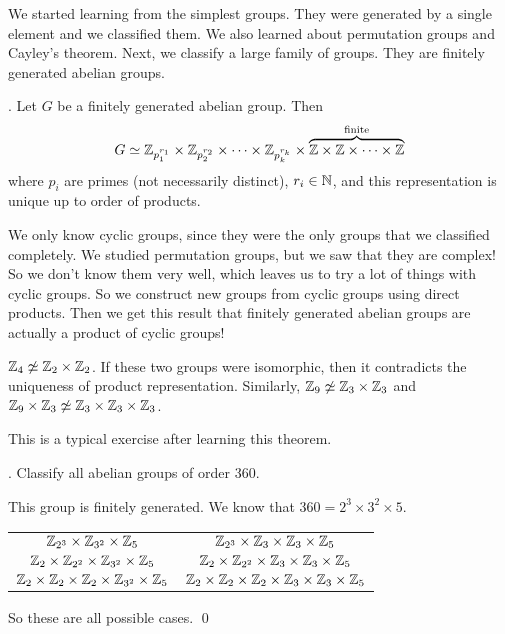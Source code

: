 We started learning from the simplest groups. They were generated by a single element and we classified them. We also learned about permutation groups and Cayley's theorem. Next, we classify a large family of groups. They are finitely generated abelian groups.

\thm.  Let \(G\) be a finitely generated abelian group. Then
\[
    G \simeq\mathbb{Z}_{p_1^{r_1}} \times \mathbb{Z}_{p_2^{r_2}} \times \cdots \times \mathbb{Z}_{p_k^{r_k}} \times \overbrace{\mathbb{Z} \times \mathbb{Z} \times \cdots \times \mathbb{Z}}^{\text{finite}}
\]
where \(p_i\) are primes (not necessarily distinct), \(r_i \in \mathbb{N}\), and this representation is unique up to order of products.

We only know cyclic groups, since they were the only groups that we classified completely. We studied permutation groups, but we saw that they are complex! So we don't know them very well, which leaves us to try a lot of things with cyclic groups. So we construct new groups from cyclic groups using direct products. Then we get this result that finitely generated abelian groups are actually a product of cyclic groups!

\rmk \(\mathbb{Z}_4 \not\simeq \mathbb{Z}_2 \times \mathbb{Z}_2\). If these two groups were isomorphic, then it contradicts the uniqueness of product representation. Similarly, \(\mathbb{Z}_9 \not\simeq \mathbb{Z}_3 \times \mathbb{Z}_3\) and \(\mathbb{Z}_9 \times \mathbb{Z}_3 \not\simeq \mathbb{Z}_3 \times \mathbb{Z}_3 \times \mathbb{Z}_3\).

This is a typical exercise after learning this theorem.

\ex. Classify all abelian groups of order 360.

\pf This group is finitely generated. We know that \(360 = 2^3 \times 3^2 \times 5\).
\begin{center}
    \begin{tabular}{cc}
        \(\mathbb{Z}_{2^3} \times \mathbb{Z}_{3^2} \times \mathbb{Z}_5\)                           & \(\mathbb{Z}_{2^3} \times \mathbb{Z}_3 \times \mathbb{Z}_3 \times \mathbb{Z}_5\)                           \\
        \(\mathbb{Z}_{2} \times \mathbb{Z}_{2^2} \times \mathbb{Z}_{3^2} \times \mathbb{Z}_5\)             & \(\mathbb{Z}_{2} \times \mathbb{Z}_{2^2} \times \mathbb{Z}_3 \times \mathbb{Z}_3 \times \mathbb{Z}_5\)             \\
        \(\mathbb{Z}_{2} \times \mathbb{Z}_{2} \times \mathbb{Z}_{2} \times \mathbb{Z}_{3^2} \times \mathbb{Z}_5\) & \(\mathbb{Z}_{2} \times \mathbb{Z}_{2} \times \mathbb{Z}_{2} \times \mathbb{Z}_3 \times \mathbb{Z}_3 \times \mathbb{Z}_5\)
    \end{tabular}
\end{center}
So these are all possible cases. \qed

